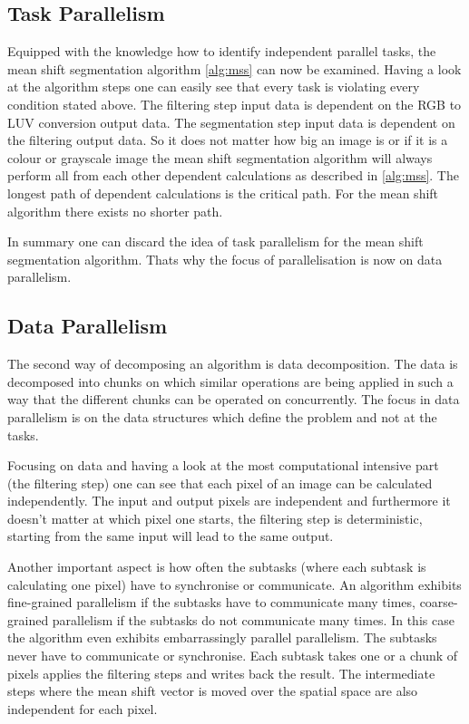 \subsection{Task Parallelism} %
\label{sub:task_parallelism}

Equipped with the knowledge how to identify independent parallel tasks, the mean
shift segmentation algorithm \autoref{alg:mss} can now be examined. Having a
look at the algorithm steps one can easily see that every task is violating
every condition stated above. The filtering step input data is dependent on the
\gls{RGB} to \gls{LUV} conversion output data. The segmentation step input data
is dependent on the filtering output data. So it does not matter how big an
image is or if it is a colour or grayscale image the mean shift segmentation
algorithm will always perform all from each other dependent calculations as
described in \autoref{alg:mss}. The longest path of dependent calculations is
the critical path. For the mean shift algorithm there exists no shorter path.

In summary one can discard the idea of task parallelism for the mean shift
segmentation algorithm. Thats why the focus of parallelisation is now on data
parallelism. 


\subsection{Data Parallelism} %
\label{sub:data_parallelism}
The second way of decomposing an algorithm is data decomposition. The data is
decomposed into chunks on which similar operations are being applied in such a
way that the different chunks can be operated on concurrently. The focus in data
parallelism is on the data structures which define the problem and not at the
tasks.

Focusing on data and having a look at the most computational intensive part (the
filtering step) one can see that each pixel of an image can be calculated
independently. The input and output pixels are independent and furthermore it
doesn't matter at which pixel one starts, the filtering step is deterministic,
starting from the same input will lead to the same output.

Another important aspect is how often the subtasks (where each subtask is
calculating one pixel) have to synchronise or communicate. An algorithm exhibits
fine-grained parallelism if the subtasks have to communicate many times,
coarse-grained parallelism if the subtasks do not communicate many times. In
this case the algorithm even exhibits embarrassingly parallel parallelism. The
subtasks never have to communicate or synchronise. Each subtask takes one or a
chunk of pixels applies the filtering steps and writes back the result. The
intermediate steps where the mean shift vector is moved over the spatial space
are also independent for each pixel.

